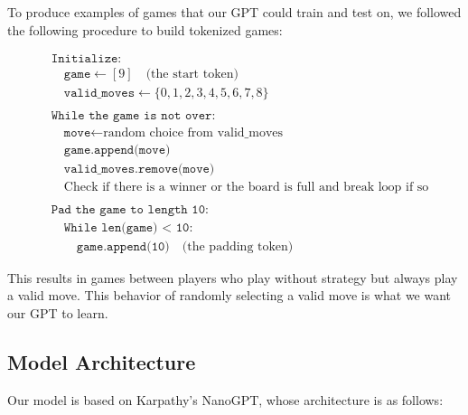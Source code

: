 \documentclass[11pt]{article}
\begin{document}
To produce examples of games that our GPT could train and test on, we
followed the following procedure to build tokenized games:

\begin{equation*}
\begin{aligned}
&\texttt{Initialize:} \\
&\quad \texttt{game} \leftarrow [9] \quad \text{(the start token)} \\
&\quad \texttt{valid\_moves} \leftarrow \{0, 1, 2, 3, 4, 5, 6, 7, 8\} \\
\\
&\texttt{While the game is not over:} \\
&\quad \texttt{move} \leftarrow \text{random choice from valid\_moves} \\
&\quad \texttt{game.append(move)} \\
&\quad \texttt{valid\_moves.remove(move)} \\
&\quad \text{Check if there is a winner or the board is full and break loop if so} \\
\\
&\texttt{Pad the game to length 10:} \\
&\quad \texttt{While len(game) < 10:} \\
&\quad\quad \texttt{game.append(10)} \quad \text{(the padding token)}
\end{aligned}
\end{equation*}

This results in games between players who play without strategy but
always play a valid move. This behavior of randomly selecting a valid
move is what we want our GPT to learn.

    \subsection{Model Architecture}\label{model-architecture}

Our model is based on Karpathy's NanoGPT, whose architecture is as
follows:
\end{document}
